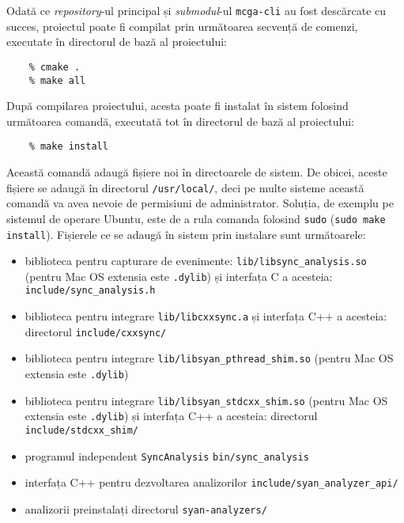 Odată ce \textit{repository}-ul principal și \textit{submodul}-ul
\lstinline{mcga-cli} au fost descărcate cu succes, proiectul poate fi
compilat prin următoarea secvență de comenzi, executate în directorul de
bază al proiectului:

\begin{minipage}{\linewidth}
\begin{lstlisting}
    % cmake .
    % make all
\end{lstlisting}
\end{minipage}

După compilarea proiectului, acesta poate fi instalat în sistem folosind
următoarea comandă, executată tot în directorul de bază al proiectului:

\begin{minipage}{\linewidth}
\begin{lstlisting}
    % make install
\end{lstlisting}
\end{minipage}

Această comandă adaugă fișiere noi în directoarele de sistem. De obicei,
aceste fișiere se adaugă în directorul \lstinline{/usr/local/}, deci pe
multe sisteme această comandă va avea nevoie de permisiuni de
administrator. Soluția, de exemplu pe sistemul de operare Ubuntu, este
de a rula comanda folosind \lstinline{sudo}
(\lstinline{sudo make install}). Fișierele ce se adaugă în sistem prin
instalare sunt următoarele:

\begin{itemize}
    \item biblioteca pentru capturare de evenimente:
    \lstinline{lib/libsync_analysis.so} (pentru Mac OS extensia este
    \lstinline{.dylib}) și interfața C a acesteia:
    \lstinline{include/sync_analysis.h}
    \item biblioteca pentru integrare \lstinline{lib/libcxxsync.a} și
    interfața C++ a acesteia: directorul \lstinline{include/cxxsync/}
    \item biblioteca pentru integrare
    \lstinline{lib/libsyan_pthread_shim.so} (pentru Mac OS extensia este
    \lstinline{.dylib})
    \item biblioteca pentru integrare
    \lstinline{lib/libsyan_stdcxx_shim.so} (pentru Mac OS extensia
    este \lstinline{.dylib}) și interfața C++ a acesteia: directorul
    \lstinline{include/stdcxx_shim/}
    \item programul independent \lstinline{SyncAnalysis}
    \lstinline{bin/sync_analysis}
    \item interfața C++ pentru dezvoltarea analizorilor
    \lstinline{include/syan_analyzer_api/}
    \item analizorii preinstalați directorul \lstinline{syan-analyzers/}
\end{itemize}

